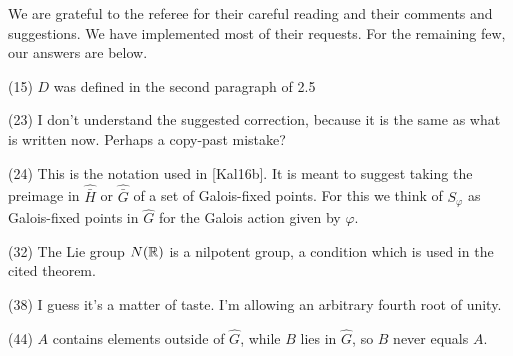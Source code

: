 \documentclass{article}
\renewcommand{\-}{\hyp{}}
\numberwithin{equation}{section}
\begin{document}
We are grateful to the referee for their careful reading and their comments and suggestions. We have implemented most of their requests. For the remaining few, our answers are below.

(15) $D$ was defined in the second paragraph of 2.5

(23) I don't understand the suggested correction, because it is the same as what is written now. Perhaps a copy-past mistake?

(24) This is the notation used in [Kal16b]. It is meant to suggest taking the preimage in $\hat{\bar H}$ or $\hat{\bar G}$ of a set of Galois-fixed points. For this we think of $S_\varphi$ as Galois-fixed points in $\hat G$ for the Galois action given by $\varphi$.

(32) The Lie group $N(\mathbb{R})$ is a nilpotent group, a condition which is used in the cited theorem.

(38) I guess it's a matter of taste. I'm allowing an arbitrary fourth root of unity.

(44) $A$ contains elements outside of $\hat G$, while $B$ lies in $\hat G$, so $B$ never equals $A$.
\end{document}
